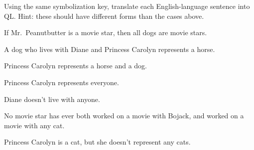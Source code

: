 \problempart
\label{pr.QLbojackother}
Using the same symbolization key, translate each English-language sentence into QL. Hint: these should have different forms than the cases above.
\begin{earg}
\item If Mr.\ Peanutbutter is a movie star, then all dogs are movie stars.
\item A dog who lives with Diane and Princess Carolyn represents a horse.
\item Princess Carolyn represents a horse and a dog.
\item Princess Carolyn represents everyone.
\item Diane doesn't live with anyone.
\item No movie star has ever both worked on a movie with Bojack, and worked on a movie with any cat.
\item Princess Carolyn is a cat, but she doesn't represent any cats.
\end{earg}



